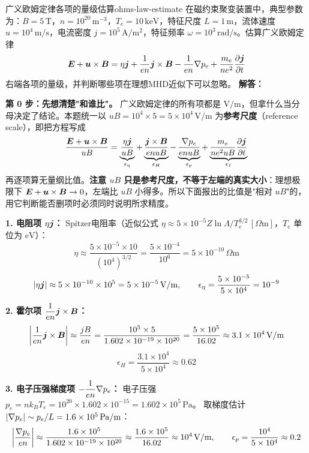 \begin{example}{广义欧姆定律各项的量级估算}{ohms-law-estimate}
在磁约束聚变装置中，典型参数为：$B=5\,\mathrm{T}$，$n=10^{20}\,\mathrm{m}^{-3}$，$T_e=10\,\mathrm{keV}$，特征尺度 $L=1\,\mathrm{m}$，流体速度 $u=10^4\,\mathrm{m/s}$，电流密度 $j=10^5\,\mathrm{A/m^2}$，特征频率 $\omega=10^3\,\mathrm{rad/s}$。估算广义欧姆定律
\[
\bm{E} + \bm{u}\times\bm{B} = \eta\bm{j} + \frac{1}{en}\bm{j}\times\bm{B} - \frac{1}{en}\nabla p_e + \frac{m_e}{ne^2}\frac{\partial\bm{j}}{\partial t}
\]
右端各项的量级，并判断哪些项在理想MHD近似下可以忽略。
\tcblower
\textbf{解答：}

\textbf{第 0 步：先想清楚"和谁比"。} 广义欧姆定律的所有项都是 $\mathrm{V/m}$，但拿什么当分母决定了结论。本题统一以 $uB=10^4\times5=5\times10^4\,\mathrm{V/m}$ 为\textbf{参考尺度}（reference scale），即把方程写成
\[
\frac{\bm{E} + \bm{u}\times\bm{B}}{uB}
= \underbrace{\frac{\eta\bm{j}}{uB}}_{\epsilon_\eta}
+ \underbrace{\frac{\bm{j}\times\bm{B}}{enuB}}_{\epsilon_H}
- \underbrace{\frac{\nabla p_e}{enuB}}_{\epsilon_p}
+ \underbrace{\frac{m_e}{ne^2uB}\frac{\partial\bm{j}}{\partial t}}_{\epsilon_I}
\]
再逐项算无量纲比值。\textbf{注意 $uB$ 只是参考尺度，不等于左端的真实大小}：理想极限下 $\bm{E}+\bm{u}\times\bm{B}\to0$，左端比 $uB$ 小得多。所以下面报出的比值是"相对 $uB$"的，用它判断能否删项时必须同时说明所求精度。

\textbf{1. 电阻项 $\eta\bm{j}$：}
Spitzer电阻率（近似公式 $\eta \approx 5\times 10^{-5} Z\ln\Lambda / T_e^{3/2}\,[\Omega\mathrm{m}]$，$T_e$ 单位为 $\mathrm{eV}$）：
\[
\eta \approx \frac{5\times 10^{-5}\times 10}{(10^4)^{3/2}} = \frac{5\times 10^{-4}}{10^6} = 5\times 10^{-10}\,\Omega\mathrm{m}
\]
\[
|\eta\bm{j}| \approx 5\times 10^{-10}\times 10^5 = 5\times 10^{-5}\,\mathrm{V/m},
\qquad \epsilon_\eta = \frac{5\times10^{-5}}{5\times10^4} = 10^{-9}
\]

\textbf{2. 霍尔项 $\dfrac{1}{en}\bm{j}\times\bm{B}$：}
\[
\left|\frac{1}{en}\bm{j}\times\bm{B}\right| \approx \frac{jB}{en} = \frac{10^5\times 5}{1.602\times 10^{-19}\times 10^{20}} = \frac{5\times 10^5}{16.02} \approx 3.1\times 10^4\,\mathrm{V/m}
\]
\[
\epsilon_H = \frac{3.1\times10^4}{5\times10^4} \approx 0.62
\]

\textbf{3. 电子压强梯度项 $-\dfrac{1}{en}\nabla p_e$：}
电子压强 $p_e = nk_{\!B}T_e = 10^{20}\times 1.602\times 10^{-15} = 1.602\times 10^5\,\mathrm{Pa}$。
取梯度估计 $|\nabla p_e| \sim p_e/L = 1.6\times 10^5\,\mathrm{Pa/m}$：
\[
\left|\frac{\nabla p_e}{en}\right| \approx \frac{1.6\times 10^5}{1.602\times 10^{-19}\times 10^{20}} \approx \frac{1.6\times 10^5}{16.02} \approx 10^4\,\mathrm{V/m},
\qquad \epsilon_p = \frac{10^4}{5\times10^4} \approx 0.2
\]


\end{example}
